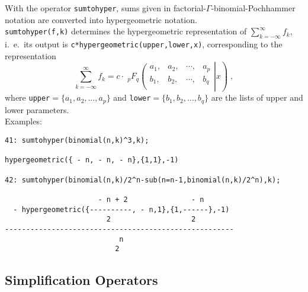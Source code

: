 With the operator {\tt sumtohyper}, sums given in 
factorial-$\Gamma$-binomial-Poch\-hammer notation
are converted into hypergeometric notation.\\
\texttt{sumtohyper(f,k)} determines the hypergeometric representation
of
$\sum\limits_{k=-\infty}^\infty f_k$,
i.\ e.\ 
its output is {\tt c*hypergeometric(upper,lower,x)}, corresponding to
the representation
\[
\sum\limits_{k=-\infty}^\infty f_k=c\cdot\;
_{p}F_{q}\left.\left(\begin{array}{cccc}
a_{1},&a_{2},&\cdots,&a_{p}\\
b_{1},&b_{2},&\cdots,&b_{q}\\
            \end{array}\right| x\right)
\;,
\]
where {\tt upper}$=\{a_{1}, a_{2}, \ldots, a_{p}\}$
and {\tt lower}$=\{b_{1}, b_{2}, \ldots, b_{q}\}$
are the lists of upper and lower parameters.
\\
Examples:

{\small
\begin{verbatim}
41: sumtohyper(binomial(n,k)^3,k);

hypergeometric({ - n, - n, - n},{1,1},-1)

42: sumtohyper(binomial(n,k)/2^n-sub(n=n-1,binomial(n,k)/2^n),k);

                      - n + 2               - n
  - hypergeometric({----------, - n,1},{1,------},-1)
                        2                   2
------------------------------------------------------
                           n
                          2
\end{verbatim}
}\noindent


\subsection{Simplification Operators}


